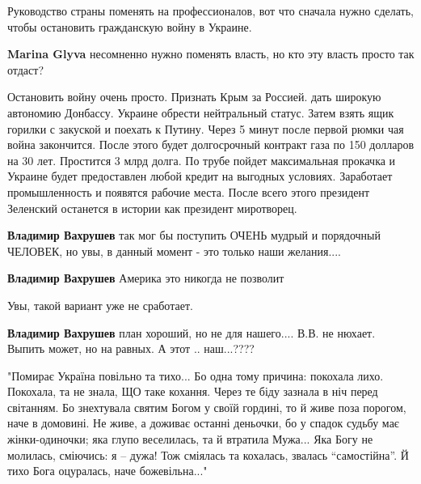 \begin{itemize}

Руководство страны поменять на профессионалов, вот что сначала нужно сделать,
чтобы остановить гражданскую войну в Украине.

\begin{itemize} %
\textbf{Marina Glyva} несомненно нужно поменять власть, но кто эту власть просто так отдаст?
\end{itemize} %


Остановить войну очень просто. Признать Крым за Россией. дать широкую автономию
Донбассу. Украине обрести нейтральный статус. Затем взять ящик горилки с
закуской и поехать к Путину. Через 5 минут после первой рюмки чая война
закончится. После этого будет долгосрочный контракт газа по 150 долларов на 30
лет. Простится 3 млрд долга. По трубе пойдет максимальная прокачка и Украине
будет предоставлен любой кредит на выгодных условиях. Заработает промышленность
и появятся рабочие места. После всего этого президент Зеленский останется в
истории как президент миротворец.

\begin{itemize} %
\textbf{Владимир Вахрушев} так мог бы поступить ОЧЕНЬ мудрый и порядочный ЧЕЛОВЕК, но увы, в данный момент - это только наши желания....

\textbf{Владимир Вахрушев} Америка это никогда не позволит

Увы, такой вариант уже не сработает.

\textbf{Владимир Вахрушев} план хороший, но не для нашего.... В.В. не нюхает. Выпить может, но на равных. А этот .. наш...????
\end{itemize} %



\begin{multicols}{2}
\obeycr
"Помирає Україна
повільно та тихо...
Бо одна тому причина:
покохала лихо.
\smallskip
Покохала, та не знала,
ЩО таке кохання.
Через те біду зазнала
в ніч перед світанням.
\smallskip
Бо знехтувала святим Богом
у своїй гордині,
то й живе поза порогом,
наче в домовині.
\smallskip
Не живе, а доживає
останні деньочки,
бо у спадок судьбу має
жінки-одиночки;
\smallskip
яка глупо веселилась,
та й втратила Мужа...
Яка Богу не молилась,
сміючись: я – дужа!
\smallskip
Тож сміялась та кохалась,
звалась \enquote{самостійна}.
Й тихо Бога оцуралась,
наче божевільна..." 
\restorecr
\end{multicols}


\end{itemize}
